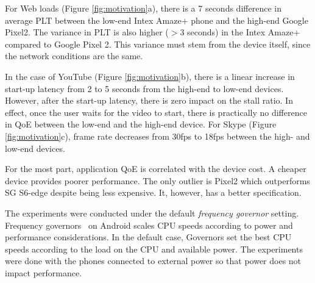 For Web loads (Figure \ref{fig:motivation}a), there is a 7 seconds difference in average PLT between the low-end Intex Amaze+ phone and the high-end Google Pixel2. The variance in PLT is also higher ($>$3 seconds) in the Intex Amaze+ compared to Google Pixel 2. This variance must stem from the device itself, since the network conditions are the same.

In the case of YouTube (Figure \ref{fig:motivation}b), there is a linear increase 
in start-up latency from 2 to 5 seconds from the high-end to low-end devices. However, after the start-up latency, there is zero impact on the stall ratio. In effect, once the user waits for the video to start, there is practically no difference in QoE between the low-end and the high-end device. For Skype (Figure \ref{fig:motivation}c), frame rate decreases from 30fps to 18fps between the high- and low-end devices.

For the most part, application QoE is correlated with the device cost.  A
cheaper device provides poorer performance. The only outlier is Pixel2 
which outperforms SG S6-edge despite being less expensive. It, however,
has a better specification. 

The experiments were conducted under the default {\em frequency governor} setting. 
Frequency governors~\cite{ad-governors} on 
Android scales CPU speeds according to power and performance considerations. In the default case, 
Governors set the best CPU speeds according to the load on the CPU and available power. 
The experiments were done with the phones connected to external power so that
power does not impact performance. 




